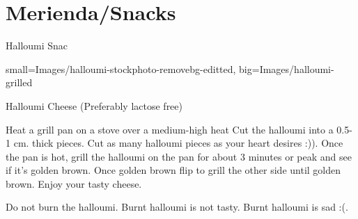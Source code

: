 \chapter{Merienda/Snacks}
\begin{recipe}
[ %
	preparationtime = {\unit[20]{min}},
	portion = \portion{1},
	source = D-Rap
]
{{Halloumi Snac}}
	
	\graph
	{%
		small=Images/halloumi-stockphoto-removebg-editted,	%
		big=Images/halloumi-grilled %
	}
	
	\ingredients
	{%
		Halloumi Cheese (Preferably lactose free)
	}
	
	\preparation
	{ %
	    \step[1] Heat a grill pan on a stove over a medium-high heat 
		\step Cut the halloumi into a 0.5-1 cm. thick pieces. Cut as many halloumi pieces as your heart desires :)).
		\step Once the pan is hot, grill the halloumi on the pan for about 3 minutes or peak and see if it's golden brown. Once golden brown flip to grill the other side until golden brown.
		\step[1] Enjoy your tasty cheese.
	}
	
	\hint
	{%
		Do not burn the halloumi. Burnt halloumi is not tasty. Burnt halloumi is sad :(.
	}

\end{recipe}
